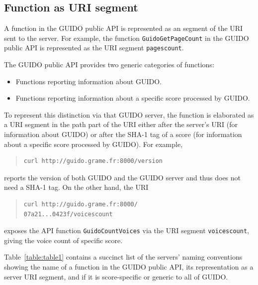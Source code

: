 \documentclass[11pt,a4paper]{article}
\newcommand{\guidosize}{7pt}
\begin{document}
\subsection{Function as URI segment}
A function in the GUIDO public API is represented as an segment of the URI sent to the server.  For example, the function \verb=GuidoGetPageCount= in the GUIDO public API is represented as the URI segment \verb=pagescount=.\par
The GUIDO public API provides two generic categories of functions:
\begin{itemize}[noitemsep]
\item Functions reporting information about GUIDO.
\item Functions reporting information about a specific score processed by GUIDO.
\end{itemize}
To represent this distinction via that GUIDO server, the function is elaborated as a URI segment in the path part of the URI either after the server's URI (for information about GUIDO) or after the SHA-1 tag of a score (for information about a specific score processed by GUIDO).  For example,
\begin{quote}
\begingroup
\fontsize{\guidosize}{12pt}\selectfont
\begin{verbatim}
curl http://guido.grame.fr:8000/version
\end{verbatim}
\endgroup
\end{quote}
reports the version of both GUIDO and the GUIDO server and thus does not need a SHA-1 tag.  On the other hand, the URI
\begin{quote}
\begingroup
\fontsize{\guidosize}{12pt}\selectfont
\begin{verbatim}
curl http://guido.grame.fr:8000/
07a21...0423f/voicescount
\end{verbatim}
\endgroup
\end{quote}
exposes the API function \verb=GuidoCountVoices= via the URI segment \verb=voicescount=, giving the voice count of specific score.\par
Table~\ref{table:table1} contains a succinct list of the servers' naming conventions showing the name of a function in the GUIDO public API, its representation as a server URI segment, and if it is score-specific or generic to all of GUIDO.
\end{document}

